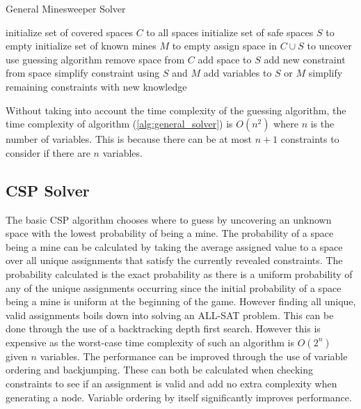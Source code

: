\documentclass[letterpaper]{article}
\begin{document}
\begin{algorithm}[t]
\caption{General Minesweeper Solver}
\label{alg:general_solver}
\begin{algorithmic}
\STATE initialize set of covered spaces $C$ to all spaces
\STATE initialize set of safe spaces $S$ to empty
\STATE initialize set of known mines $M$ to empty
		\STATE assign space in $C \cup S$ to uncover
	\ELSE
		\STATE use guessing algorithm
	\ENDIF
		\STATE remove space from $C$
		\STATE add space to $S$
		\STATE add new constraint from space
		\STATE simplify constraint using $S$ and $M$
			\STATE add variables to $S$ or $M$
		\ENDIF
		\STATE simplify remaining constraints with new knowledge
	\ENDIF
\ENDWHILE
\end{algorithmic}
\end{algorithm}

Without taking into account the time complexity of the guessing algorithm, the time complexity of algorithm (\ref{alg:general_solver}) is $O(n^2)$ where $n$ is the number of variables.  This is because there can be at most $n+1$ constraints to consider if there are $n$ variables.

\subsection{CSP Solver}
The basic CSP algorithm chooses where to guess by uncovering an unknown space with the lowest probability of being a mine.  The probability of a space being a mine can be calculated by taking the average assigned value to a space over all unique assignments that satisfy the currently revealed constraints.  The probability calculated is the exact probability as there is a uniform probability of any of the unique assignments occurring since the initial probability of a space being a mine is uniform at the beginning of the game.  However finding all unique, valid assignments boils down into solving an ALL-SAT problem.  This can be done through the use of a backtracking depth first search.  However this is expensive as the worst-case time complexity of such an algorithm is $O(2^n)$ given $n$ variables.  The performance can be improved through the use of variable ordering and backjumping.  These can both be calculated when checking constraints to see if an assignment is valid and add no extra complexity when generating a node.  Variable ordering by itself significantly improves performance.
\end{document}
